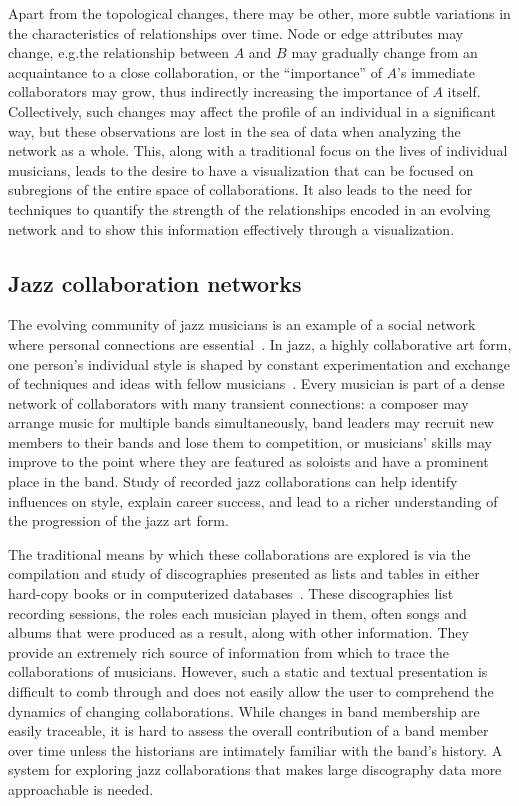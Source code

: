 \documentclass[12pt]{cmuthesis}
\begin{document}
  Apart from the topological changes, there may be other, more subtle variations in the characteristics of relationships over time.  Node or edge attributes may change, e.g.\@ the relationship between $A$ and $B$ may gradually change from an acquaintance to a close collaboration, or the ``importance'' of $A$'s immediate collaborators may grow, thus indirectly increasing the importance of $A$ itself.  Collectively, such changes may affect the profile of an individual in a significant way, but these observations are lost in the sea of data when analyzing the network as a whole. This, along with a traditional focus on the lives of individual musicians, leads to the desire to have a visualization that can be focused on subregions of the entire space of collaborations. It also leads to the need for techniques to quantify the strength of the relationships encoded in an evolving network and to show this information effectively through a visualization.

  \subsection{Jazz collaboration networks}

  The evolving community of jazz musicians is an example of a social network where personal connections are essential~\cite{Pinheiro2009}. In jazz, a highly collaborative art form, one person's individual style is shaped by constant experimentation and exchange of techniques and ideas with fellow musicians~\cite{Berliner1994}.  Every musician is part of a dense network of collaborators with many transient connections: a composer may arrange music for multiple bands simultaneously, band leaders may recruit new members to their bands and lose them to competition, or musicians' skills may improve to the point where they are featured as soloists and have a prominent place in the band. Study of recorded jazz collaborations can help identify influences on style, explain career success, and lead to a richer understanding of the progression of the jazz art form.

  The traditional means by which these collaborations are explored is via the compilation and study of discographies presented as lists and tables in either hard-copy books or in computerized databases~\cite{Timner2007,Albin}. These discographies list recording sessions, the roles each musician played in them, often songs and albums that were produced as a result, along with other information. They provide an extremely rich source of information from which to trace the collaborations of musicians. However, such a static and textual presentation is difficult to comb through and does not easily allow the user to comprehend the dynamics of changing collaborations. While changes in band membership are easily traceable, it is hard to assess the overall contribution of a band member over time unless the historians are intimately familiar with the band's history. A system for exploring jazz collaborations that makes large discography data more approachable is needed.
\end{document}

